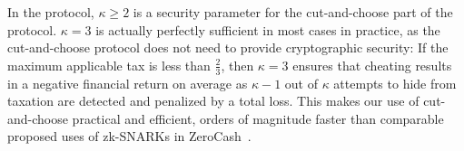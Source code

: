 \documentclass[sigconf, authordraft]{acmart}
\begin{document}
In the protocol, $\kappa \ge 2$ is a security parameter for the
cut-and-choose part of the protocol.  $\kappa = 3$ is actually
perfectly sufficient in most cases in practice, as the cut-and-choose
protocol does not need to provide cryptographic security: If the
maximum applicable tax is less than $\frac{2}{3}$, then $\kappa = 3$
ensures that cheating results in a negative financial return on
average as $\kappa - 1$ out of $\kappa$ attempts to hide from taxation
are detected and penalized by a total loss.  This makes our use of
cut-and-choose practical and efficient, orders of magnitude faster
than comparable proposed uses of zk-SNARKs in ZeroCash~\cite{AccountableZerocash}.

\end{document}

